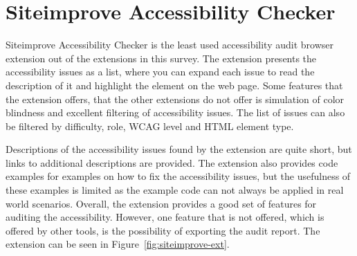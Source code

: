 \section{Siteimprove Accessibility Checker}
Siteimprove Accessibility Checker \parencite{siteimprove} is the least used accessibility audit browser extension out of the extensions in this survey.
The extension presents the accessibility issues as a list, where you can expand each issue to read the description of it and highlight the element on the web page.
Some features that the extension offers, that the other extensions do not offer is simulation of color blindness and excellent filtering of accessibility issues.
The list of issues can also be filtered by difficulty, role, WCAG level and HTML element type.

Descriptions of the accessibility issues found by the extension are quite short, but links to additional descriptions are provided.
The extension also provides code examples for examples on how to fix the accessibility issues, but the usefulness of these examples is limited as the example code can not always be applied in real world scenarios.
Overall, the extension provides a good set of features for auditing the accessibility.
However, one feature that is not offered, which is offered by other tools, is the possibility of exporting the audit report. The extension can be seen in Figure~\ref{fig:siteimprove-ext}.


